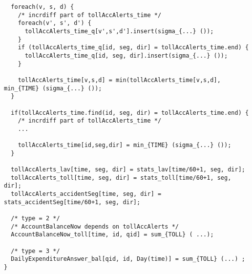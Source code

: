 \begin{verbatim}
  foreach(v, s, d) {
    /* incrdiff part of tollAccAlerts_time */
    foreach(v', s', d') {
      tollAccAlerts_time_q[v',s',d'].insert(sigma_{...} ());
    }
    if (tollAccAlerts_time_q[id, seg, dir] = tollAccAlerts_time.end) {
      tollAccAlerts_time_q[id, seg, dir].insert(sigma_{...} ());
    }
    
    tollAccAlerts_time[v,s,d] = min(tollAccAlerts_time[v,s,d], min_{TIME} (sigma_{...} ());
  }
  
  if(tollAccAlerts_time.find(id, seg, dir) = tollAccAlerts_time.end) {
    /* incrdiff part of tollAccAlerts_time */
    ...
    
    tollAccAlerts_time[id,seg,dir] = min_{TIME} (sigma_{...} ());
  }
  
  tollAccAlerts_lav[time, seg, dir] = stats_lav[time/60+1, seg, dir];
  tollAccAlerts_toll[time, seg, dir] = stats_toll[time/60+1, seg, dir];
  tollAccAlerts_accidentSeg[time, seg, dir] = stats_accidentSeg[time/60+1, seg, dir];
  
  /* type = 2 */
  /* AccountBalanceNow depends on tollAccAlerts */
  AccountBalanceNow_toll[time, id, qid] = sum_{TOLL} ( ...);
  
  /* type = 3 */
  DailyExpenditureAnswer_bal[qid, id, Day(time)] = sum_{TOLL} (...) ;
}
\end{verbatim}

